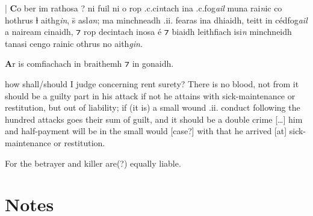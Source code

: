 \documentclass[11pt]{article}
\begin{document}
\begin{pages}
\begin{Leftside}
    \beginnumbering
    \pstart
    | \textbf{C}o ber  im rathosa ? ni fuil ni o rop .c.ci\emph{n}tach ina .c.fog\emph{ail} muna rai\emph{n}ic co hothrus ɫ aithg\emph{in}, \={s} asl\emph{an}; ma minchneadh .ii. fearas ina dhiaidh, teitt in c\'{e}dfog\emph{ail} a naiream cinaidh, ⁊ rop decintach inosa \'{e} ⁊ biaidh leithfiach isi\emph{n} minchneidh tanasi cengo rainic othrus no aith\emph{gin}.
    \pend

    \pstart
    \textbf{A}r is comfiachach in braithemh ⁊ in gonaidh.
    \pend
    \endnumbering
  \end{Leftside}

\begin{Rightside}
    \beginnumbering
   \pstart
   how shall/should I judge concerning rent surety? There is no blood, not from it should be a guilty part in his attack if not he attains with sick-maintenance or restitution, but out of liability; if (it is) a small wound .ii. conduct following the hundred attacks goes their sum of guilt, and it should be a double crime [\ldots] him and half-payment will be in the small would [case?] with that he arrived [at] sick-maintenance or restitution. 
   \pend

   \pstart
    For the betrayer and killer are(?) equally liable. 
   \pend
    \endnumbering
  \end{Rightside}
  \Pages


\end{pages}

\section{Notes}
\end{document}
